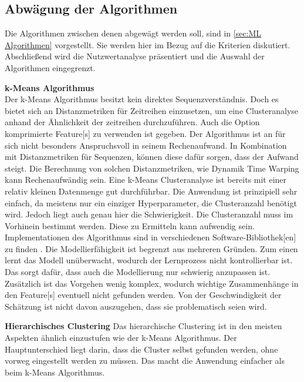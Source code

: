 \subsection{Abwägung der Algorithmen}
Die Algorithmen zwischen denen abgewägt werden soll, sind in \ref{sec:ML Algorithmen} vorgestellt. Sie werden hier im Bezug auf die Kriterien diskutiert. Abschließend wird die Nutzwertanalyse präsentiert und die Auswahl der Algorithmen eingegrenzt. \par

\textbf{k-Means Algorithmus}\\
Der k-Means Algorithmus besitzt kein direktes Sequenzverständnis. Doch es bietet sich an Distanzmetriken für Zeitreihen einzusetzen, um eine Clusteranalyse anhand der Ähnlichkeit der zeitreihen durchzuführen. Auch die Option komprimierte \gls{Feature}[s] zu verwenden ist gegeben. Der Algorithmus ist an für sich nicht besonders Anspruchsvoll in seinem Rechenaufwand. In Kombination mit Distanzmetriken für Sequenzen, können diese dafür sorgen, dass der Aufwand steigt. Die Berechnung von solchen Distanzmetriken, wie Dynamik Time Warping kann Rechenaufwändig sein. Eine k-Means Clusteranalyse ist bereits mit einer relativ kleinen Datenmenge gut durchführbar. Die Anwendung ist prinzipiell sehr einfach, da meistens nur ein einziger \gls{Hyperparameter}, die Clusteranzahl benötigt wird. Jedoch liegt auch genau hier die Schwierigkeit. Die Clusteranzahl muss im Vorhinein bestimmt werden. Diese zu Ermitteln kann aufwendig sein. Implementationen des Algorithmus sind in verschiedenen Software-\gls{Bibliothek}[en] zu finden \cite{FabianPedregosa.2011}. Die Modellierfähigkeit ist begrenzt aus mehreren Gründen. Zum einen lernt das Modell unüberwacht, wodurch der Lernprozess nicht kontrollierbar ist. Das sorgt dafür, dass auch die Modellierung nur schwierig anzupassen ist. Zusätzlich ist das Vorgehen wenig komplex, wodurch wichtige Zusammenhänge in den \gls{Feature}[s] eventuell nicht gefunden werden. Von der Geschwindigkeit der Schätzung ist nicht davon auszugehen, dass sie problematisch seien wird.

\textbf{Hierarchisches Clustering}
Das hierarchische Clustering ist in den meisten Aspekten ähnlich einzustufen wie der k-Means Algorithmus. Der Hauptunterschied liegt darin, dass die Cluster selbst gefunden werden, ohne vorweg eingestellt werden zu müssen. Das macht die Anwendung einfacher als beim k-Means Algorithmus.\par

